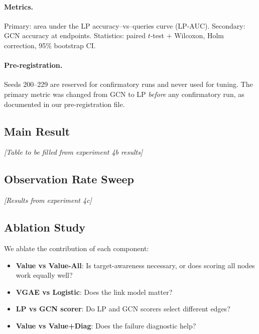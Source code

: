 \documentclass{article}
\begin{document}
\paragraph{Metrics.}
Primary: area under the LP accuracy--vs--queries curve (LP-AUC).
Secondary: GCN accuracy at endpoints.
Statistics: paired $t$-test + Wilcoxon, Holm correction, 95\% bootstrap CI.

\paragraph{Pre-registration.}
Seeds 200--229 are reserved for confirmatory runs and never used for tuning.
The primary metric was changed from GCN to LP \emph{before} any confirmatory run, as documented in our pre-registration file.

\subsection{Main Result}
\label{sec:exp_main}

\emph{[Table to be filled from experiment 4b results]}

\subsection{Observation Rate Sweep}
\label{sec:exp_obs}

\emph{[Results from experiment 4c]}

\subsection{Ablation Study}
\label{sec:exp_ablation}

We ablate the contribution of each component:
\begin{itemize}
    \item \textbf{Value vs Value-All}: Is target-awareness necessary, or does scoring all nodes work equally well?
    \item \textbf{VGAE vs Logistic}: Does the link model matter?
    \item \textbf{LP vs GCN scorer}: Do LP and GCN scorers select different edges?
    \item \textbf{Value vs Value+Diag}: Does the failure diagnostic help?
\end{itemize}
\end{document}
